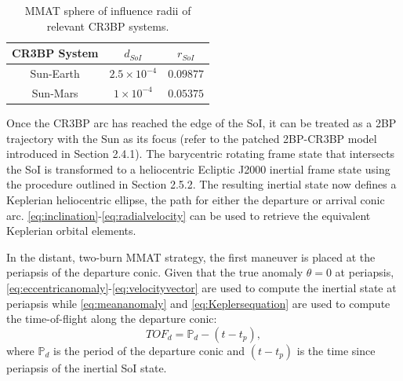 \begin{table}[ht]
    \centering
    \caption{MMAT sphere of influence radii of relevant CR3BP systems.}
    \begin{tabular}{|c|c|c|}
        \hline
        \textbf{CR3BP System}   &   \boldmath$d_{SoI}$  &   \boldmath$r_{SoI}$  \\  \hline
        Sun-Earth               &   $2.5\times10^{-4}$  &   $0.09877$           \\  \hline
        Sun-Mars                &   $1\times10^{-4}$    &   $0.05375$           \\  \hline
    \end{tabular}
    \label{tab:SoI}
\end{table}

Once the CR3BP arc has reached the edge of the SoI, it can be treated as a 2BP trajectory with the
Sun as its focus (refer to the patched 2BP-CR3BP model introduced in Section 2.4.1). The
barycentric rotating frame state that intersects the SoI is transformed to a heliocentric Ecliptic
J2000 inertial frame state using the procedure outlined in Section 2.5.2. The resulting inertial
state now defines a Keplerian heliocentric ellipse, the path for either the departure or arrival
conic arc. \cref{eq:inclination}-\cref{eq:radialvelocity} can be used to retrieve the equivalent
Keplerian orbital elements.

In the distant, two-burn MMAT strategy, the first maneuver is placed at the periapsis of the
departure conic. Given that the true anomaly $\theta=0$ at periapsis,
\cref{eq:eccentricanomaly}-\cref{eq:velocityvector} are used to compute the inertial state at
periapsis while \cref{eq:meananomaly} and \cref{eq:Keplersequation} are used to compute the
time-of-flight along the departure conic:
\begin{equation}
    TOF_{d}=\mathbb{P}_{d}-(t-t_{p}),
    \label{eq:departureTOF}
\end{equation}
where $\mathbb{P}_{d}$ is the period of the departure conic and $(t-t_{p})$ is the time since
periapsis of the inertial SoI state.

